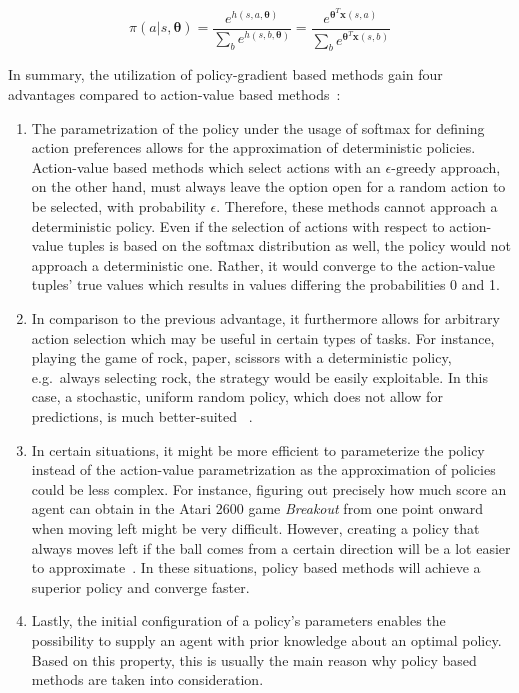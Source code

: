\documentclass[draft,final]{vutinfth} %
\newcommand{\p}[1]{see p. #1}
\begin{document}
    \begin{equation}
        \pi(a|s,\boldsymbol{\theta})=\frac{e^{h(s,a,\boldsymbol{\theta})}}{\sum_{b}e^{h(s,b,\boldsymbol{\theta})}}=\frac{e^{\boldsymbol{\theta}^T\boldsymbol{x}(s,a)}}{\sum_{b}e^{\boldsymbol{\theta}^T\boldsymbol{x}(s,b)}}\label{eq:soft_max_policy}
    \end{equation}


    In summary, the utilization of policy-gradient based methods gain four advantages compared to action-value based methods~\citep[\p{322f}]{sutton_reinforcement_2018}:

    \begin{enumerate}
        \item The parametrization of the policy under the usage of softmax for defining action preferences allows for the approximation of deterministic policies.
        Action-value based methods which select actions with an $\epsilon\text{-greedy}$ approach, on the other hand, must always leave the option open for a random action to be selected, with probability $\epsilon$.
        Therefore, these methods cannot approach a deterministic policy.
        Even if the selection of actions with respect to action-value tuples is based on the softmax distribution as well, the policy would not approach a deterministic one.
        Rather, it would converge to the action-value tuples' true values which results in values differing the probabilities 0 and 1.
        \item In comparison to the previous advantage, it furthermore allows for arbitrary action selection which may be useful in certain types of tasks.
        For instance, playing the game of rock, paper, scissors with a deterministic policy, e.g.\ always selecting rock, the strategy would be easily exploitable.
        In this case, a stochastic, uniform random policy, which does not allow for predictions, is much better-suited ~.
        \item In certain situations, it might be more efficient to parameterize the policy instead of the action-value parametrization as the approximation of policies could be less complex.
        For instance, figuring out precisely how much score an agent can obtain in the Atari 2600 game \textit{Breakout} from one point onward when moving left might be very difficult.
        However, creating a policy that always moves left if the ball comes from a certain direction will be a lot easier to approximate~.
        In these situations, policy based methods will achieve a superior policy and converge faster\citep[\p{323}]{sutton_reinforcement_2018}.
        \item Lastly, the initial configuration of a policy's parameters enables the possibility to supply an agent with prior knowledge about an optimal policy.
        Based on this property, this is usually the main reason why policy based methods are taken into consideration.
    \end{enumerate}
\end{document}
